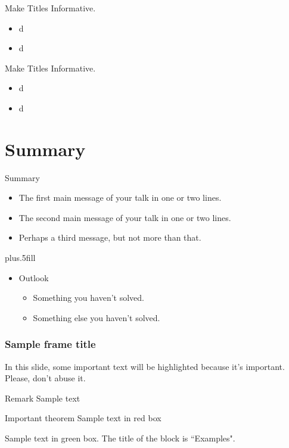 \documentclass{beamer}
\begin{document}
\begin{frame}{Make Titles Informative.}
    \begin{itemize}
    \item
       d
    \item
        d
    \end{itemize}
\end{frame}

\begin{frame}{Make Titles Informative.}
    \begin{itemize}
    \item
       d
    \item
        d
    \end{itemize}
\end{frame}



\section*{Summary}

\begin{frame}{Summary}
  \begin{itemize}
  \item
    The \alert{first main message} of your talk in one or two lines.
  \item
    The \alert{second main message} of your talk in one or two lines.
  \item
    Perhaps a \alert{third message}, but not more than that.
  \end{itemize}
  \vskip0pt plus.5fill
  \begin{itemize}
  \item
    Outlook
    \begin{itemize}
    \item
      Something you haven't solved.
    \item
      Something else you haven't solved.
    \end{itemize}
  \end{itemize}
\end{frame}

\begin{frame}
\frametitle{Sample frame title}

In this slide, some important text will be
\alert{highlighted} because it's important.
Please, don't abuse it.

\begin{block}{Remark}
Sample text
\end{block}

\begin{alertblock}{Important theorem}
Sample text in red box
\end{alertblock}

\begin{examples}
Sample text in green box. The title of the block is ``Examples".
\end{examples}
\end{frame}
\end{document}

